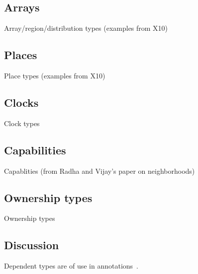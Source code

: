 \subsection{Arrays}

Array/region/distribution types (examples from X10)

\cite{gps06-arrays}

\subsection{Places}

Place types (examples from X10)

\subsection{Clocks}

Clock types

\subsection{Capabilities}

Capablities (from Radha and Vijay's paper on neighborhoods)

\subsection{Ownership types}

Ownership types~\cite{ownership-types}

\subsection{Discussion}

Dependent types are of use in annotations~\cite{ns07-x10anno}.
